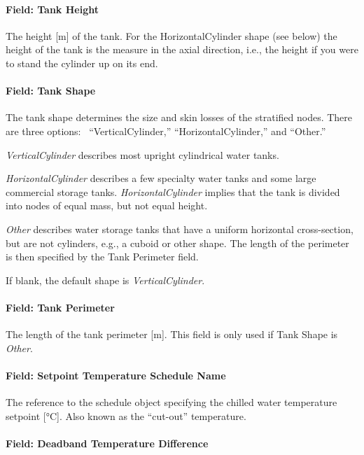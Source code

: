 \paragraph{Field: Tank Height}\label{field-tank-height}

The height {[}m{]} of the tank. For the HorizontalCylinder shape (see below) the height of the tank is the measure in the axial direction, i.e., the height if you were to stand the cylinder up on its end.

\paragraph{Field: Tank Shape}\label{field-tank-shape}

The tank shape determines the size and skin losses of the stratified nodes. There are three options:~ ``VerticalCylinder,'' ``HorizontalCylinder,'' and ``Other.''

\emph{VerticalCylinder} describes most upright cylindrical water tanks.

\emph{HorizontalCylinder} describes a few specialty water tanks and some large commercial storage tanks. \emph{HorizontalCylinder} implies that the tank is divided into nodes of equal mass, but not equal height.

\emph{Other} describes water storage tanks that have a uniform horizontal cross-section, but are not cylinders, e.g., a cuboid or other shape. The length of the perimeter is then specified by the Tank Perimeter field.

If blank, the default shape is \emph{VerticalCylinder}.

\paragraph{Field: Tank Perimeter}\label{field-tank-perimeter}

The length of the tank perimeter {[}m{]}. This field is only used if Tank Shape is \emph{Other}.

\paragraph{Field: Setpoint Temperature Schedule Name}\label{field-setpoint-temperature-schedule-name-1}

The reference to the schedule object specifying the chilled water temperature setpoint {[}°C{]}. Also known as the ``cut-out'' temperature.

\paragraph{Field: Deadband Temperature Difference}\label{field-deadband-temperature-difference-1}

